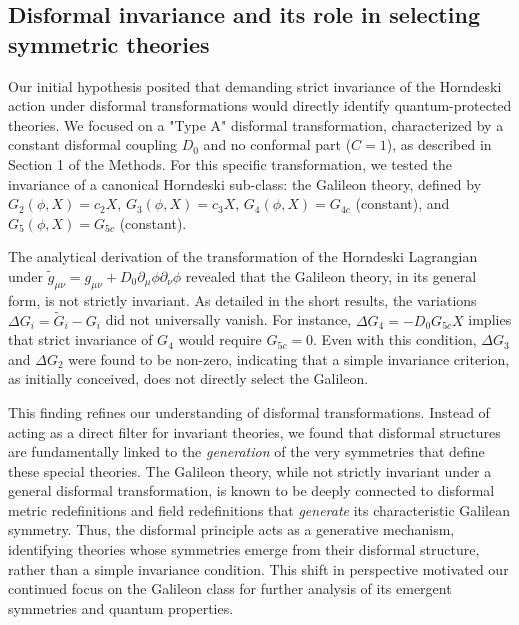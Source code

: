 \documentclass[twocolumn]{aastex631}
\begin{document}
\subsection{Disformal invariance and its role in selecting symmetric theories}
Our initial hypothesis posited that demanding strict invariance of the Horndeski action under disformal transformations would directly identify quantum-protected theories. We focused on a "Type A" disformal transformation, characterized by a constant disformal coupling $D_0$ and no conformal part ($C=1$), as described in Section 1 of the Methods. For this specific transformation, we tested the invariance of a canonical Horndeski sub-class: the Galileon theory, defined by $G_2(\phi, X) = c_2 X$, $G_3(\phi, X) = c_3 X$, $G_4(\phi, X) = G_{4c}$ (constant), and $G_5(\phi, X) = G_{5c}$ (constant).

The analytical derivation of the transformation of the Horndeski Lagrangian under $\tilde{g}_{\mu\nu} = g_{\mu\nu} + D_0 \partial_\mu \phi \partial_\nu \phi$ revealed that the Galileon theory, in its general form, is not strictly invariant. As detailed in the short results, the variations $\Delta G_i = \tilde{G}_i - G_i$ did not universally vanish. For instance, $\Delta G_4 = -D_0 G_{5c} X$ implies that strict invariance of $G_4$ would require $G_{5c}=0$. Even with this condition, $\Delta G_3$ and $\Delta G_2$ were found to be non-zero, indicating that a simple invariance criterion, as initially conceived, does not directly select the Galileon.

This finding refines our understanding of disformal transformations. Instead of acting as a direct filter for invariant theories, we found that disformal structures are fundamentally linked to the \textit{generation} of the very symmetries that define these special theories. The Galileon theory, while not strictly invariant under a general disformal transformation, is known to be deeply connected to disformal metric redefinitions and field redefinitions that \textit{generate} its characteristic Galilean symmetry. Thus, the disformal principle acts as a generative mechanism, identifying theories whose symmetries emerge from their disformal structure, rather than a simple invariance condition. This shift in perspective motivated our continued focus on the Galileon class for further analysis of its emergent symmetries and quantum properties.
\end{document}
